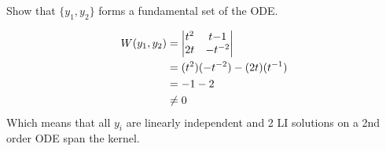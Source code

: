 Show that $\{ y_1, y_2 \}$ forms a fundamental set of the ODE.

\soln
\begin{align*}
    W(y_1, y_2) &= \begin{vmatrix}{t^2} & {t{-1}}\\{2t}&{-t^{-2}}\end{vmatrix}\\
    &= (t^2)(-t^{-2}) - (2t)(t^{-1})\\
    &= -1 -2\\
    &\neq 0
\end{align*}
Which means that all $y_{i}$ are linearly independent and 2 LI solutions on a 2nd order ODE span the kernel.  